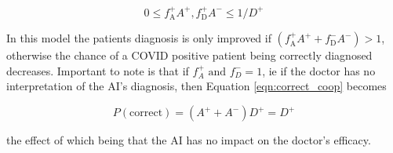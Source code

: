 \documentclass[manuscript,screen,review]{acmart}
\begin{document}
\begin{equation}
    0 \leq f^+_{\textrm{A}}A^+, f^+_{\textrm{D}}A^- \leq 1/D^+
\end{equation}


In this model the patients diagnosis is only improved if $(f^+_{\textrm{A}}A^+ + f^-_{\textrm{D}}A^-) > 1$, otherwise the chance of a COVID positive patient being correctly diagnosed decreases. Important to note is that if $f^+_A \textrm{ and } f^-_D = 1$, ie if the doctor has no interpretation of the AI's diagnosis, then Equation \ref{eqn:correct_coop} becomes

\begin{equation}
    P(\textrm{correct}) = (A^+ + A^-) D^+ = D^+
\end{equation}

the effect of which being that the AI has no impact on the doctor's efficacy. 









\end{document}
